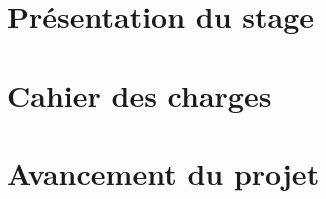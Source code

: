 \documentclass[a4paper,oneside,11pt]{article}
\begin{document}
%

\section{Présentation du stage}
%

\section{Cahier des charges}
%


\section{Avancement du projet}
%
\end{document}
